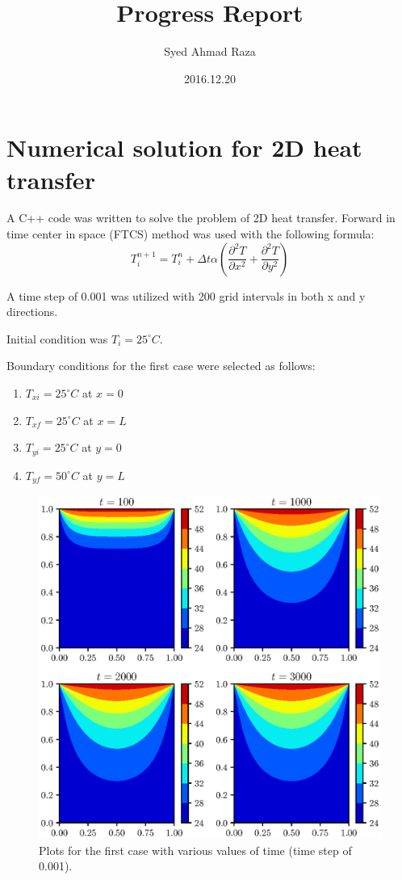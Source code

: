 \documentclass[12pt,a4paper,fleqn]{article}
\title{Progress Report}
\author{Syed Ahmad Raza}
\date{2016.12.20}
\begin{document}
\maketitle
\section*{Numerical solution for 2D heat transfer}
A C++ code was written to solve the problem of 2D heat transfer. Forward in time
center in space (FTCS) method was used with the following formula:
\begin{equation}
T_i^{n+1} = T_i^n + \Delta t \alpha(\frac{\partial^2T}{\partial x^2} +
\frac{\partial^2T}{\partial y^2})
\end{equation}

A time step of 0.001 was utilized with 200 grid intervals in both x and y
directions. %

Initial condition was $T_i=25^{\circ}C$.

Boundary conditions for the first case were selected as follows:
\begin{enumerate}
\item $T_{xi}=25^{\circ}C$ at $x=0$
\item $T_{xf}=25^{\circ}C$ at $x=L$
\item $T_{yi}=25^{\circ}C$ at $y=0$
\item $T_{yf}=50^{\circ}C$ at $y=L$
\end{enumerate}

\begin{figure}[p!]
\centering
\includegraphics[width=\linewidth]{ht2dCase01.eps}
\caption{Plots for the first case with various values of time (time step of
0.001).}
\end{figure}
\end{document}
